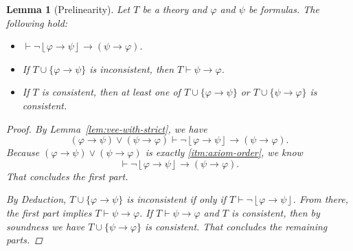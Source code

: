 \documentclass{amsart}
\newtheorem{lemma}[theorem]{Lemma}
\theoremstyle{definition}
\numberwithin{equation}{theorem}
\renewcommand{\phi}{\varphi}
\newcommand{\proves}{\vdash}
\newcommand{\strict}[1]{{\left\lfloor#1\right\rfloor}}
\newcommand{\narrow}[1]{\xrightarrow{#1}}
\renewcommand{\to}{\narrow{}}
\begin{document}
\begin{lemma}[Prelinearity]\label{lem:prelinearity}
  Let $T$ be a theory and $\phi$ and $\psi$ be formulas.
  The following hold:
  \begin{itemize}
  \item $\proves\neg\strict{\phi\to\psi}\to(\psi\to\phi)$.
  \item If $T\cup\{\phi\to\psi\}$ is inconsistent, then $T\proves\psi\to\phi$.
  \item If $T$ is consistent, then at least one of $T\cup\{\phi\to\psi\}$ or $T\cup\{\psi\to\phi\}$ is consistent.
  \end{itemize}
  \begin{proof}
    By Lemma~\ref{lem:vee-with-strict}, we have
    \[
      (\phi\to\psi)\vee(\psi\to\phi)\proves\neg\strict{\phi\to\psi}\to(\psi\to\phi).
    \]
    Because $(\phi\to\psi)\vee(\psi\to\phi)$ is exactly \ref{itm:axiom-order}, we know
    \[
      \proves\neg\strict{\phi\to\psi}\to(\psi\to\phi).
    \]
    That concludes the first part.
    
    By Deduction, $T\cup\{\phi\to\psi\}$ is inconsistent if only if $T\proves\neg\strict{\phi\to\psi}$.
    From there, the first part implies $T\proves\psi\to\phi$.
    If $T\proves\psi\to\phi$ and $T$ is consistent, then by soundness we have $T\cup\{\psi\to\phi\}$ is consistent.
    That concludes the remaining parts.
  \end{proof}
\end{lemma}
\end{document}
